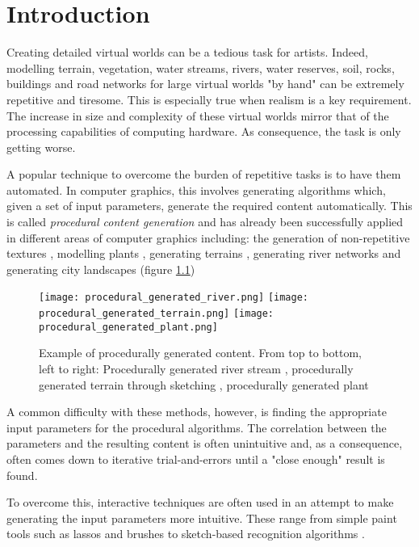 
\chapter{Introduction}

Creating detailed virtual worlds can be a tedious task for artists. Indeed, modelling terrain, vegetation, water streams, rivers, water reserves, soil, rocks, buildings and road networks for large virtual worlds "by hand" can be extremely repetitive and tiresome. This is especially true when realism is a key requirement. The increase in size and complexity of these virtual worlds mirror that of the processing capabilities of computing hardware. As consequence, the task is only getting worse.\par

A popular technique to overcome the burden of repetitive tasks is to have them automated. In computer graphics, this involves generating algorithms which, given a set of input parameters, generate the required content automatically. This is called \textit{procedural content generation} and has already been successfully applied in different areas of computer graphics including: the generation of non-repetitive textures \cite{Efros1999,Liang2001,Wei2009}, modelling plants \cite{Boudon2012,Fourcaud2008,Guo2011,Lewis1999}, generating terrains \cite{Smelik2009,Gain2009,Doran2010}, generating river networks \cite{Derzapf2011,Emilien} and generating city landscapes \cite{Gain,Kelly2007} (figure \ref{Example of procedurally generated content}) \par

\begin{figure}[h]
  \centering
	\label{Example of procedurally generated content}
	\texttt{[image: procedural\_generated\_river.png]}
	\texttt{[image: procedural\_generated\_terrain.png]}
	\texttt{[image: procedural\_generated\_plant.png]}
	\caption{Example of procedurally generated content. From top to bottom, left to right: Procedurally generated river stream \cite{Derzapf2011}, procedurally generated terrain through sketching \cite{Gain2009}, procedurally generated plant \cite{Soler2001}}
\end{figure}

A common difficulty with these methods, however, is finding the appropriate input parameters for the procedural algorithms. The correlation between the parameters and the resulting content is often unintuitive and, as a consequence, often comes down to iterative trial-and-errors until a "close enough" result is found. \par
To overcome this, interactive techniques are often used in an attempt to make generating the input parameters more intuitive. These range from simple paint tools such as lassos and brushes \cite{Emilien} to sketch-based recognition algorithms \cite{Gain2009}. \par

